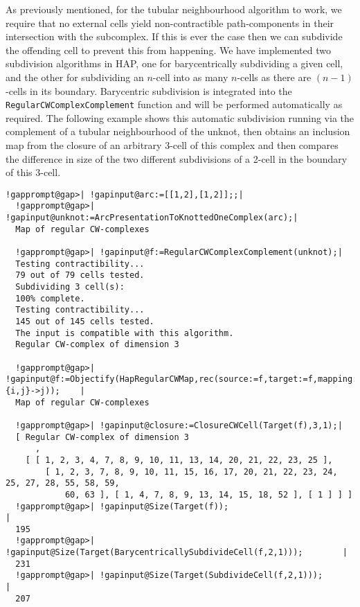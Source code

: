 \documentclass[a4paper,11pt]{report}
\begin{document}
{{\begin{Verbatim}[commandchars=!@|,fontsize=\small,frame=single,label=Example]
\end{Verbatim}
 As previously mentioned, for the tubular neighbourhood algorithm to work, we
require that no external cells yield non-contractible path-components in their
intersection with the subcomplex. If this is ever the case then we can
subdivide the offending cell to prevent this from happening. We have
implemented two subdivision algorithms in HAP, one for barycentrically
subdividing a given cell, and the other for subdividing an $n$-cell into as many $n$-cells as there are $(n-1)$-cells in its boundary. Barycentric subdivision is integrated into the \texttt{RegularCWComplexComplement} function and will be performed automatically as required. The following
example shows this automatic subdivision running via the complement of a
tubular neighbourhood of the unknot, then obtains an inclusion map from the
closure of an arbitrary $3$-cell of this complex and then compares the difference in size of the two
different subdivisions of a 2-cell in the boundary of this $3$-cell. 
\begin{Verbatim}[commandchars=!@|,fontsize=\small,frame=single,label=Example]
  !gapprompt@gap>| !gapinput@arc:=[[1,2],[1,2]];;|
  !gapprompt@gap>| !gapinput@unknot:=ArcPresentationToKnottedOneComplex(arc);|
  Map of regular CW-complexes
  
  !gapprompt@gap>| !gapinput@f:=RegularCWComplexComplement(unknot);|
  Testing contractibility...
  79 out of 79 cells tested.
  Subdividing 3 cell(s):
  100% complete. 
  Testing contractibility...
  145 out of 145 cells tested.
  The input is compatible with this algorithm.
  Regular CW-complex of dimension 3
  
  !gapprompt@gap>| !gapinput@f:=Objectify(HapRegularCWMap,rec(source:=f,target:=f,mapping:={i,j}->j));    |
  Map of regular CW-complexes
  
  !gapprompt@gap>| !gapinput@closure:=ClosureCWCell(Target(f),3,1);|
  [ Regular CW-complex of dimension 3
      , 
    [ [ 1, 2, 3, 4, 7, 8, 9, 10, 11, 13, 14, 20, 21, 22, 23, 25 ], 
        [ 1, 2, 3, 7, 8, 9, 10, 11, 15, 16, 17, 20, 21, 22, 23, 24, 25, 27, 28, 55, 58, 59, 
            60, 63 ], [ 1, 4, 7, 8, 9, 13, 14, 15, 18, 52 ], [ 1 ] ] ]
  !gapprompt@gap>| !gapinput@Size(Target(f));                                          |
  195
  !gapprompt@gap>| !gapinput@Size(Target(BarycentricallySubdivideCell(f,2,1)));        |
  231
  !gapprompt@gap>| !gapinput@Size(Target(SubdivideCell(f,2,1)));        |
  207
  
\end{Verbatim}
 }

}
\end{document}
